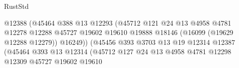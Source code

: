 \begin{lexlean}{RustStd}
\begin{coremodule}
                                                    @12388
                                                    (@45464
                                                      @388
                                                      @13
                                                      @12293
                                                      (@45712
                                                        @121
                                                        @24
                                                        @13
                                                        @4958
                                                        @4781
                                                        @12278
                                                        @12288
                                                        @45727
                                                        @19602
                                                        @19610
                                                        @19888
                                                        @18146
                                                        (@16099 (@19629 @12288 @12279))
                                                        @16249))
                                                    (@45456
                                                      @393
                                                      @3703
                                                      @13
                                                      @19
                                                      @12314
                                                      @12387
                                                      (@45464
                                                        @393
                                                        @13
                                                        @12314
                                                        (@45712
                                                          @127
                                                          @24
                                                          @13
                                                          @4958
                                                          @4781
                                                          @12298
                                                          @12309
                                                          @45727
                                                          @19602
                                                          @19610

\end{coremodule}
\end{lexlean}
